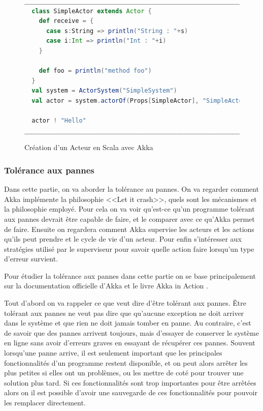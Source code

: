 \documentclass[11pt, a4paper]{article}
\begin{document}
\begin{figure}[ht]
\centering
\begin{lstlisting}[language=Scala]
__________________________________________________________________________
  class SimpleActor extends Actor {
    def receive = {
      case s:String => println("String : "+s)
      case i:Int => println("Int : "+i)
    }
    
    def foo = println("method foo")
  }
  val system = ActorSystem("SimpleSystem")
  val actor = system.actorOf(Props[SimpleActor], "SimpleActor")
  
  actor ! "Hello"
___________________________________________________________________________
\end{lstlisting}
\caption{Création d'un Acteur en Scala avec Akka}
\label{act_crea}
\end{figure}

\subsubsection{Tolérance aux pannes}
Dans cette partie, on va aborder la tolérance au pannes. On va regarder comment Akka implémente la philosophie <<Let it crash>>, quels sont les mécanismes et la philosophie employé. Pour cela on va voir qu'est-ce qu'un programme tolérant aux pannes devrait être capable de faire, et le comparer avec ce qu'Akka permet de faire. Ensuite on regardera comment Akka supervise les acteurs et les actions qu'ils peut prendre et le cycle de vie d'un acteur. Pour enfin s’intéresser aux stratégies utilisé par le superviseur pour savoir quelle action faire lorsqu'un type d'erreur survient.
\par Pour étudier la tolérance aux pannes dans cette partie on se base principalement sur la documentation officielle d'Akka \cite{akka} et le livre Akka in Action \cite{roestenburg2015akka}.

\par Tout d'abord on va rappeler ce que veut dire d'être tolérant aux pannes. Être tolérant aux pannes ne veut pas dire que qu'aucune exception ne doit arriver dans le système et que rien ne doit jamais tomber en panne. Au contraire, c'est de savoir que des pannes arrivent toujours, mais d'essayer de conserver le système en ligne sans avoir d'erreurs graves en essayant de récupérer ces pannes. Souvent lorsqu'une panne arrive, il est seulement important que les principales fonctionnalités d'un programme restent disponible, et on peut alors arrêter les plus petites si elles ont un problèmes, ou les mettre de coté pour trouver une solution plus tard. Si ces fonctionnalités sont trop importantes pour être arrêtées alors on il est possible d'avoir une sauvegarde de ces fonctionnalités pour pouvoir les remplacer directement.
\end{document}
